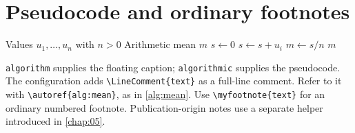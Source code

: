 \section{Pseudocode and ordinary footnotes}
\begin{algorithm}[htbp]
\caption{Mean of a nonempty sequence}\label{alg:mean}
\begin{algorithmic}[1]
\Require Values $u_1,\ldots,u_n$ with $n>0$
\Ensure Arithmetic mean $m$
\State $s\gets 0$
  \State $s\gets s+u_i$
\EndFor
{}
\State $m\gets s/n$
\State \Return $m$
\end{algorithmic}
\end{algorithm}
\texttt{algorithm} supplies the floating caption; \texttt{algorithmic} supplies
the pseudocode. The configuration adds \verb|\LineComment{text}| as a full-line
comment. Refer to it with \verb|\autoref{alg:mean}|, as in \autoref{alg:mean}.
Use \verb|\myfootnote{text}| for an ordinary numbered footnote.
Publication-origin notes use a separate helper introduced in \autoref{chap:05}.
